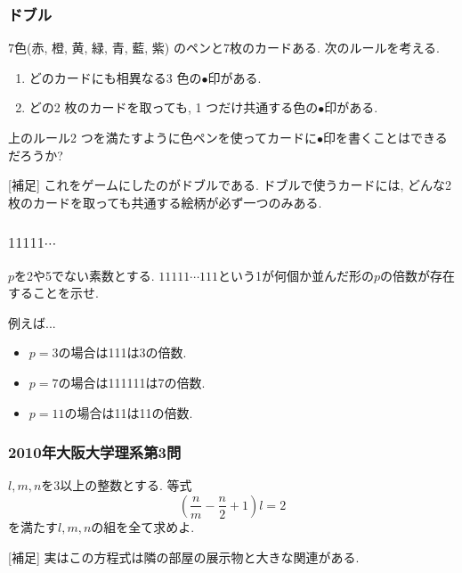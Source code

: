 \documentclass[11pt,dvipdfmx]{beamer}
\theoremstyle{definition}
\theoremstyle{remark}
\begin{document}
\begin{frame}
\frametitle{ドブル}
7色(赤, 橙, 黄, 緑, 青, 藍, 紫) のペンと7枚のカードある. 次のルールを考える.
\begin{enumerate}
    \setlength{\parskip}{0cm} 
  \setlength{\itemsep}{0cm} 
\item どのカードにも相異なる3 色の$\bullet$印がある.
\item どの2 枚のカードを取っても, 1 つだけ共通する色の$\bullet$印がある.
\end{enumerate}
上のルール2 つを満たすように色ペンを使ってカードに$\bullet$印を書くことはできるだろうか?

\vspace{20pt}
{\footnotesize
[補足] これをゲームにしたのがドブルである. ドブルで使うカードには, どんな2枚のカードを取っても共通する絵柄が必ず一つのみある. 
}

\end{frame}

\begin{frame}
\frametitle{$11111\cdots $}
$p$を2や5でない素数とする. 
$11111\cdots 111$という1が何個か並んだ形の$p$の倍数が存在することを示せ.

\vspace{20pt}
例えば...
\begin{itemize}
  \item $p=3$の場合は111は3の倍数.
  \item $p=7$の場合は111111は7の倍数.
  \item $p=11$の場合は11は11の倍数.
  \end{itemize}
\end{frame}


\begin{frame}
\frametitle{2010年大阪大学理系第3問}
$l,m,n$を3以上の整数とする. 等式
$$
\left( \frac{n}{m} - \frac{n}{2} + 1 \right)l = 2
$$
を満たす$l,m,n$の組を全て求めよ. 

\vspace{20pt}
{\footnotesize
[補足] 実はこの方程式は隣の部屋の展示物と大きな関連がある. 
}
\end{frame}
\end{document}

